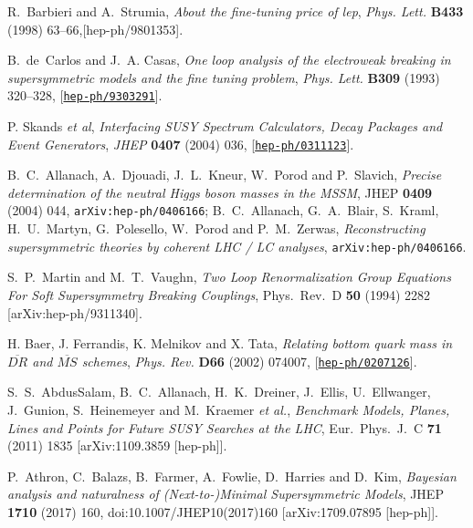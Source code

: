 \documentclass{article}
\def\hepph#1{{\tt arXiv:hep-ph/0406166}}
\begin{document}
\begin{thebibliography}{10}
R.~Barbieri and A.~Strumia, {\it About the fine-tuning price of lep},  {\em
  Phys. Lett.} {\bf B433} (1998) 63--66,[hep-ph/9801353]. 


 B.~de~Carlos and J.~A. Casas, {\it One loop analysis of the electroweak
   breaking in supersymmetric models and the fine tuning problem},  {\em Phys.
   Lett.} {\bf B309} (1993) 320--328,
   [\href{http://xxx.lanl.gov/abs/hep-ph/9303291}{{\tt hep-ph/9303291}}].

P. Skands {\em et al}, {\it Interfacing SUSY Spectrum Calculators, Decay
  Packages and Event Generators}, {\em JHEP} {\bf 0407} (2004) 036,
  [\href{http://xxx.lanl.gov/abs/hep-ph/0311123}{{\tt hep-ph/0311123}}].


B.~C.~Allanach, A.~Djouadi, J.~L.~Kneur, W.~Porod and P.~Slavich,
{\em Precise determination of the neutral Higgs boson masses in the MSSM},   JHEP {\bf 0409} (2004) 044,
\hepph{0406166};
B.~C.~Allanach, G.~A.~Blair, S.~Kraml, H.~U.~Martyn, G.~Polesello, W.~Porod and P.~M.~Zerwas,
{\em Reconstructing supersymmetric theories by coherent LHC / LC analyses},
\hepph{0403133}.

 S.~P.~Martin and M.~T.~Vaughn,
  {\em Two Loop Renormalization Group Equations For Soft Supersymmetry Breaking
  Couplings},
  Phys.\ Rev.\  D {\bf 50} (1994) 2282
  [arXiv:hep-ph/9311340].



H. Baer, J. Ferrandis, K. Melnikov and X. Tata, {\it Relating bottom quark
  mass in $\overline{DR}$ and $\overline{MS}$ schemes},
{\em Phys. Rev.} {\bf D66} (2002) 074007,
  [\href{http://xxx.lanl.gov/abs/hep-ph/0207126}{{\tt hep-ph/0207126}}].

S.~S.~AbdusSalam, B.~C.~Allanach, H.~K.~Dreiner, J.~Ellis, U.~Ellwanger, J.~Gunion, S.~Heinemeyer and M.~Kraemer {\it et al.},
  {\em Benchmark Models, Planes, Lines and Points for Future SUSY Searches at the LHC},
  Eur.\ Phys.\ J.\ C {\bf 71} (2011) 1835
  [arXiv:1109.3859 [hep-ph]].

 P.~Athron, C.~Balazs, B.~Farmer, A.~Fowlie, D.~Harries and D.~Kim,
  {\em Bayesian analysis and naturalness of (Next-to-)Minimal Supersymmetric Models},
  JHEP {\bf 1710} (2017) 160,
  doi:10.1007/JHEP10(2017)160
  [arXiv:1709.07895 [hep-ph]].


\end{thebibliography}
\end{document}
